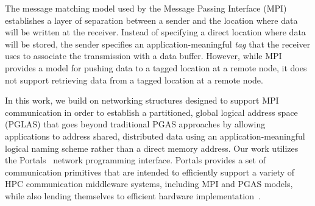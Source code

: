 The message matching model used by the Message Passing Interface (MPI)
establishes a layer of separation between a sender and the location where data
will be written at the receiver.  Instead of specifying a direct location where
data will be stored, the sender specifies an application-meaningful {\em tag}
that the receiver uses to associate the transmission with a data buffer.
However, while MPI provides a model for pushing data to a tagged location at a
remote node, it does not support retrieving data from a tagged location at a
remote node.


In this work, we build on networking structures designed to support MPI
communication in order to establish a partitioned, global logical address space
(PGLAS) that goes beyond traditional PGAS approaches by allowing applications
to address shared, distributed data using an application-meaningful logical
naming scheme rather than a direct memory address.  Our work utilizes the
Portals~\cite{portals} network programming interface.  Portals provides a set
of communication primitives that are intended to efficiently support a variety
of HPC communication middleware systems, including MPI and PGAS models, while
also lending themselves to efficient hardware
implementation~\cite{cray-xt,bull-bxi}.

%

